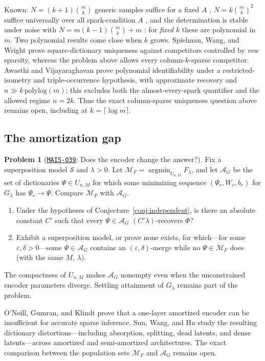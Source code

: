 \documentclass[11pt]{amsart}
\newcommand{\Oid}[1]{\href{https://github.com/lionellevine/MAIS/blob/main/open-problems/MAIS-O#1.md}{\texttt{MAIS-O#1}}}
\theoremstyle{plain}
\theoremstyle{definition}
\newtheorem{problem}[theorem]{Problem}
\begin{document}
Known: $N=(k+1)\binom{m}{k}$ generic samples suffice for a fixed $A$ \cite{aharon2006,hillar2015}, $N=k\binom{m}{k}^2$ suffice universally over all spark-condition $A$ \cite{hillar2015}, and the determination is stable under noise with $N = m(k-1)\binom{m}{k}+m$ \cite{garfinkle2019}; for \emph{fixed} $k$ these are polynomial in $m$. Two polynomial results come close when $k$ grows. Spielman, Wang, and Wright \cite{spielman2012} prove square-dictionary uniqueness against competitors controlled by \emph{row} sparsity, whereas the problem above allows every column-$k$-sparse competitor. Awasthi and Vijayaraghavan \cite{awasthi2018} prove polynomial identifiability under a restricted-isometry and triple-occurrence hypothesis, with approximate recovery and $n\gg k\,\mathrm{polylog}(m)$; this excludes both the almost-every-spark quantifier and the allowed regime $n=2k$. Thus the exact column-sparse uniqueness question above remains open, including at $k=\lceil\log m\rceil$.

\subsection{The amortization gap}

\begin{problem}[\Oid{39}: Does the encoder change the answer?]\label{prob:amortization}
Fix a superposition model $\mathcal S$ and $\lambda>0$. Let $\mathcal M_F=\operatorname{argmin}_{U_{n,M}}F_\lambda$, and let $\mathcal A_G$ be the set of dictionaries $\Psi\in U_{n,M}$ for which some minimizing sequence $(\Psi_r,W_r,b_r)$ for $G_\lambda$ has $\Psi_r\to\Psi$. Compare $\mathcal M_F$ with $\mathcal A_G$.
\begin{enumerate}
\item Under the hypotheses of Conjecture~\ref{conj:independent}, is there an absolute constant $C'$ such that every $\Psi\in\mathcal A_G$ $(C'\lambda)$-recovers $\Phi$?
\item Exhibit a superposition model, or prove none exists, for which---for some $\varepsilon,\delta>0$---some $\Psi\in\mathcal A_G$ contains an $(\varepsilon,\delta)$-merge while no $\Psi\in\mathcal M_F$ does (with the same $M$, $\lambda$).
\end{enumerate}
The compactness of $U_{n,M}$ makes $\mathcal A_G$ nonempty even when the unconstrained encoder parameters diverge. Settling attainment of $G_\lambda$ remains part of the problem.
\end{problem}

O'Neill, Gumran, and Klindt \cite{oneill2024} prove that a one-layer amortized encoder can be insufficient for accurate sparse inference. Sun, Wang, and Hu \cite{sunwanghu2026} study the resulting dictionary distortions---including absorption, splitting, dead latents, and dense latents---across amortized and semi-amortized architectures. The exact comparison between the population sets $\mathcal M_F$ and $\mathcal A_G$ remains open.
\end{document}
